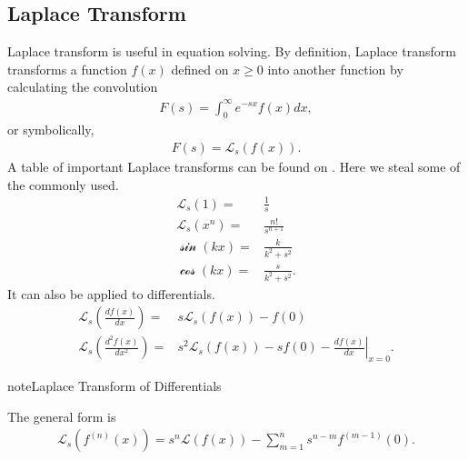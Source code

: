 \documentclass[letterpaper,10pt,english]{sphinxmanual}
\begin{document}
\subsection{Laplace Transform}
\label{\detokenize{equation-solving-in-neuroscience/laplace-transform:laplace-transform}}
Laplace transform is useful in equation solving. By definition, Laplace transform transforms a function \(f(x)\) defined on \(x\geq 0\) into another function by calculating the convolution
\begin{equation*}
\begin{split}F(s) = \int_0^\infty e^{-s x} f(x) dx,\end{split}
\end{equation*}
or symbolically,
\begin{equation*}
\begin{split}F(s) = \mathcal L_s (f(x)).\end{split}
\end{equation*}
A table of important Laplace transforms can be found on . Here we steal some of the commonly used.
\begin{equation*}
\begin{split}\mathcal L_s (1) =& \frac{1}{s}\\
\mathcal L_s (x^n) =& \frac{n!}{s^{n+1}}\\
\mathcal \sin(kx) =& \frac{k}{k^2+s^2} \\
\mathcal \cos(kx) =& \frac{s}{k^2+s^2}.\end{split}
\end{equation*}
It can also be applied to differentials.
\begin{equation*}
\begin{split}\mathcal L_s \left(\frac{d f(x)}{dx}\right) =& s \mathcal L_s (f(x)) - f(0) \\
\mathcal L_s \left(\frac{d^2f(x)}{dx^2}\right) =& s^2 \mathcal L_s (f(x)) - s f(0) - \left.\frac{df(x)}{dx}\right\vert_{x=0}.\end{split}
\end{equation*}
\begin{sphinxadmonition}{note}{Laplace Transform of Differentials}

The general form is
\begin{equation*}
\begin{split}\mathcal L_s (f^{(n)}(x)) = s^n \mathcal L (f(x)) - \sum_{m=1}^n s^{n-m} f^{(m-1)}(0).\end{split}
\end{equation*}\end{sphinxadmonition}
\end{document}

